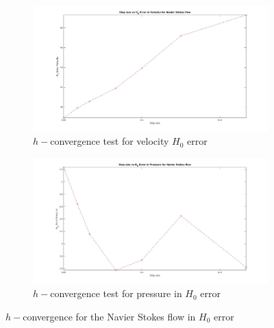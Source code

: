 \documentclass[a4paper,twoside,openright]{book}
\begin{document}
\begin{figure}
\begin{subfigure}{\textwidth}	
  \includegraphics[width=\linewidth]{H0_convergence_velocity_n_s.jpg}
  \caption{$h-$convergence test for velocity $H_0$ error}
  \label{fig:vel_navier_stoke_conv_h0}
\end{subfigure}
\begin{subfigure}{\textwidth}	
  \includegraphics[width=\linewidth]{H0_convergence_pressure_n_s.jpg}
  \caption{$h-$convergence test for pressure in $H_0$ error}
  \label{fig:pre_navier_stoke_conv_h0}
\end{subfigure}
\caption{$h-$convergence for the Navier Stokes flow in $H_0$ error}
\label{navier_stoke_conv_h0}
\end{figure}
\end{document}
